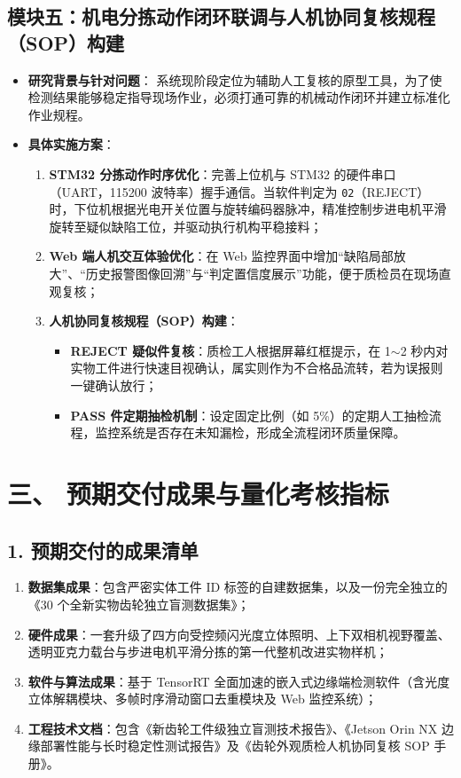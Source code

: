 \subsection*{模块五：机电分拣动作闭环联调与人机协同复核规程（SOP）构建}
\begin{itemize}
    \item \textbf{研究背景与针对问题}：
    系统现阶段定位为辅助人工复核的原型工具，为了使检测结果能够稳定指导现场作业，必须打通可靠的机械动作闭环并建立标准化作业规程。
    \item \textbf{具体实施方案}：
    \begin{enumerate}
        \item \textbf{STM32 分拣动作时序优化}：完善上位机与 STM32 的硬件串口（UART，115200 波特率）握手通信。当软件判定为 \texttt{02}（REJECT）时，下位机根据光电开关位置与旋转编码器脉冲，精准控制步进电机平滑旋转至疑似缺陷工位，并驱动执行机构平稳接料；
        \item \textbf{Web 端人机交互体验优化}：在 Web 监控界面中增加“缺陷局部放大”、“历史报警图像回溯”与“判定置信度展示”功能，便于质检员在现场直观复核；
        \item \textbf{人机协同复核规程（SOP）构建}：
        \begin{itemize}
            \item \textbf{REJECT 疑似件复核}：质检工人根据屏幕红框提示，在 1$\sim$2 秒内对实物工件进行快速目视确认，属实则作为不合格品流转，若为误报则一键确认放行；
            \item \textbf{PASS 件定期抽检机制}：设定固定比例（如 5\%）的定期人工抽检流程，监控系统是否存在未知漏检，形成全流程闭环质量保障。
        \end{itemize}
    \end{enumerate}
\end{itemize}

\section*{三、 预期交付成果与量化考核指标}

\subsection*{1. 预期交付的成果清单}
\begin{enumerate}
    \item \textbf{数据集成果}：包含严密实体工件 ID 标签的自建数据集，以及一份完全独立的《30 个全新实物齿轮独立盲测数据集》；
    \item \textbf{硬件成果}：一套升级了四方向受控频闪光度立体照明、上下双相机视野覆盖、透明亚克力载台与步进电机平滑分拣的第一代整机改进实物样机；
    \item \textbf{软件与算法成果}：基于 TensorRT 全面加速的嵌入式边缘端检测软件（含光度立体解耦模块、多帧时序滑动窗口去重模块及 Web 监控系统）；
    \item \textbf{工程技术文档}：包含《新齿轮工件级独立盲测技术报告》、《Jetson Orin NX 边缘部署性能与长时稳定性测试报告》及《齿轮外观质检人机协同复核 SOP 手册》。
\end{enumerate}


